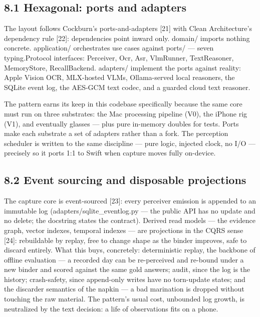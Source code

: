 \subsection{8.1 Hexagonal: ports and adapters}\label{hexagonal-ports-and-adapters}

The layout follows Cockburn's ports-and-adapters {[}21{]} with Clean Architecture's dependency rule {[}22{]}: dependencies point inward only. domain/ imports nothing concrete. application/ orchestrates use cases against ports/ --- seven typing.Protocol interfaces: Perceiver, Ocr, Asr, VlmRunner, TextReasoner, MemoryStore, RecallBackend. adapters/ implement the ports against reality: Apple Vision OCR, MLX-hosted VLMs, Ollama-served local reasoners, the SQLite event log, the AES-GCM text codec, and a guarded cloud text reasoner.

The pattern earns its keep in this codebase specifically because the same core must run on three substrates: the Mac processing pipeline (V0), the iPhone rig (V1), and eventually glasses --- plus pure in-memory doubles for tests. Ports make each substrate a set of adapters rather than a fork. The perception scheduler is written to the same discipline --- pure logic, injected clock, no I/O --- precisely so it ports 1:1 to Swift when capture moves fully on-device.

\subsection{8.2 Event sourcing and disposable projections}\label{event-sourcing-and-disposable-projections}

The capture core is event-sourced {[}23{]}: every perceiver emission is appended to an immutable log (adapters/sqlite\_eventlog.py --- the public API has no update and no delete; the docstring states the contract). Derived read models --- the evidence graph, vector indexes, temporal indexes --- are projections in the CQRS sense {[}24{]}: rebuildable by replay, free to change shape as the binder improves, safe to discard entirely. What this buys, concretely: deterministic replay, the backbone of offline evaluation --- a recorded day can be re-perceived and re-bound under a new binder and scored against the same gold answers; audit, since the log is the history; crash-safety, since append-only writes have no torn-update states; and the discarder semantics of the napkin --- a bad marination is dropped without touching the raw material. The pattern's usual cost, unbounded log growth, is neutralized by the text decision: a life of observations fits on a phone.

